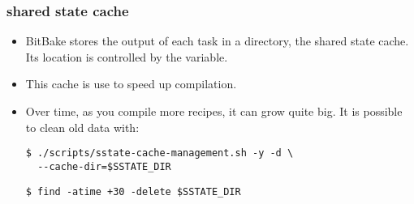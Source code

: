 \begin{frame}[fragile]
  \frametitle{shared state cache}
  \begin{itemize}
    \item BitBake stores the output of each task in a directory, the
      shared state cache. Its location is controlled by the
       variable.
    \item This cache is use to speed up compilation.
    \item Over time, as you compile more recipes, it can grow quite
      big. It is possible to clean old data with:
      \begin{block}{}
        \begin{verbatim}
$ ./scripts/sstate-cache-management.sh -y -d \
  --cache-dir=$SSTATE_DIR
        \end{verbatim}
      \end{block}
      \begin{block}{}
        \begin{verbatim}
$ find -atime +30 -delete $SSTATE_DIR
        \end{verbatim}
      \end{block}
  \end{itemize}
\end{frame}

